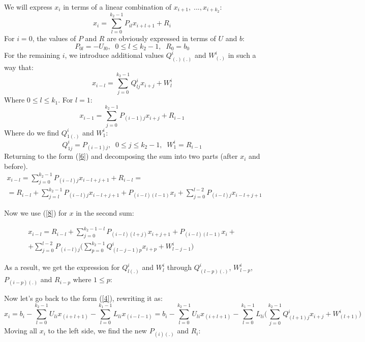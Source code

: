 \documentclass{article}
\begin{document}
We will express $x_i$ in terms of a linear combination of $x_{i+1}, \;..., x_{i+k_2}$: 
\begin{equation}\label{6}
    x_i = \sum_{l=0}^{k_2 - 1} P_{il} x_{i+l + 1} + R_{i}
\end{equation}
For $i = 0$, the values of $P$ and $R$ are obviously expressed in terms of $U$ and $b$:
\begin{equation}
    P_{0l} = -U_{l0}, \;\; 0 \leq l \leq k_2-1, \;\; R_0 = b_0
\end{equation}
For the remaining $i$, we introduce additional values $Q^{i}_{(.)(.)}$ and $W^{i}_{(.)}$ in such a way that:
\begin{equation}\label{8}
    x_{i-l} = \sum_{j = 0}^{k_2-1} Q^{i}_{lj} x_{i + j} + W^{i}_l
\end{equation}
Where $0 \leq l \leq k_1$. For $l = 1$:
\begin{equation}
    x_{i-1} = \sum_{j = 0}^{k_2-1} P_{(i-1)j} x_{i + j} + R_{i-1}
\end{equation}
Where do we find $Q^{i}_{1(.)} $ and $W^i_{1}$:
\begin{equation}
    Q^i_{1j} = P_{(i-1)j}, \;\; 0 \leq j \leq k_2-1, \;\; W^i_{1} = R_{i-1}
\end{equation}
 Returning to the form (\ref{6}) and decomposing the sum into two parts (after $x_i$ and before).
\begin{multline}
        x_{i-l} = \sum_{j = 0}^{k_2-1} P_{(i-l)j} x_{i - l + j + 1} + R_{i-l} = \\ = R_{i-l} +  \sum_{j = l}^{k_2-1} P_{(i-l)j} x_{i - l + j + 1} + P_{(i-l)(l-1)}x_i  + \sum_{j = 0}^{l-2} P_{(i-l)j}  x_{i - l + j + 1}
\end{multline}

Now we use (\ref{8}) for $x$ in the second sum:

\begin{multline}
    x_{i-l} = R_{i-l} +  \sum_{j = 0}^{k_2-1 - l} P_{(i-l)(l + j)} x_{i + j + 1} + P_{(i-l)(l-1)}x_i + \\ + \sum_{j = 0}^{l-2} P_{(i-l)j} \Big(\sum_{p = 0}^{k_2-1} Q^{i}_{(l - j - 1)p} x_{i + p} + W^{i}_{l - j - 1} \Big)
\end{multline}

As a result, we get the expression for $Q^{i}_{l(.)}$ and $W^{i}_{l}$ through $Q^{i}_{(l-p)(.)}$, $W^{i}_{l-p}$, $P_{(i-p)(.)}$ and $R_{i-p}$ where $1 \leq p$:

Now let's go back to the form (\ref{4}), rewriting it as:
\begin{equation}
      x_{i}  = b_i - \sum_{l = 0}^{k_2 - 1} U_{li} x_{(i+l + 1)} - \sum_{l = 0}^{k_1 - 1} L_{li} x_{(i-l - 1)} =  b_i - \sum_{l = 0}^{k_2 - 1} U_{li} x_{(i+l + 1)} - \sum_{l = 0}^{k_1 - 1} L_{li} \Big( \sum_{j = 0}^{k_2-1} Q^{i}_{(l + 1)j} x_{i + j} + W^{i}_{(l + 1)}\Big)
\end{equation}
Moving all $x_i$ to the left side, we find the new $P_{(i)(.)}$ and $R_i$:
\end{document}
